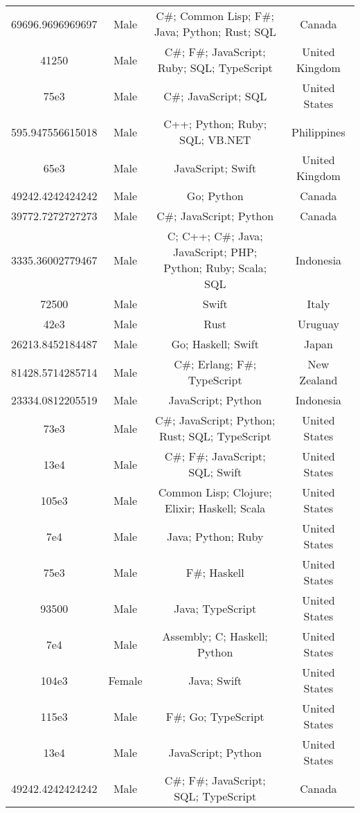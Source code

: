 \begin{center}
\begin{tabular}{ |c|c|c|c| }
69696.9696969697  &  Male  &  C\#; Common Lisp; F\#; Java; Python; Rust; SQL  &  Canada  \\ 
41250  &  Male  &  C\#; F\#; JavaScript; Ruby; SQL; TypeScript  &  United Kingdom  \\ 
75e3  &  Male  &  C\#; JavaScript; SQL  &  United States  \\ 
595.947556615018  &  Male  &  C++; Python; Ruby; SQL; VB.NET  &  Philippines  \\ 
65e3  &  Male  &  JavaScript; Swift  &  United Kingdom  \\ 
49242.4242424242  &  Male  &  Go; Python  &  Canada  \\ 
39772.7272727273  &  Male  &  C\#; JavaScript; Python  &  Canada  \\ 
3335.36002779467  &  Male  &  C; C++; C\#; Java; JavaScript; PHP; Python; Ruby; Scala; SQL  &  Indonesia  \\ 
72500  &  Male  &  Swift  &  Italy  \\ 
42e3  &  Male  &  Rust  &  Uruguay  \\ 
26213.8452184487  &  Male  &  Go; Haskell; Swift  &  Japan  \\ 
81428.5714285714  &  Male  &  C\#; Erlang; F\#; TypeScript  &  New Zealand  \\ 
23334.0812205519  &  Male  &  JavaScript; Python  &  Indonesia  \\ 
73e3  &  Male  &  C\#; JavaScript; Python; Rust; SQL; TypeScript  &  United States  \\ 
13e4  &  Male  &  C\#; F\#; JavaScript; SQL; Swift  &  United States  \\ 
105e3  &  Male  &  Common Lisp; Clojure; Elixir; Haskell; Scala  &  United States  \\ 
7e4  &  Male  &  Java; Python; Ruby  &  United States  \\ 
75e3  &  Male  &  F\#; Haskell  &  United States  \\ 
93500  &  Male  &  Java; TypeScript  &  United States  \\ 
7e4  &  Male  &  Assembly; C; Haskell; Python  &  United States  \\ 
104e3  &  Female  &  Java; Swift  &  United States  \\ 
115e3  &  Male  &  F\#; Go; TypeScript  &  United States  \\ 
13e4  &  Male  &  JavaScript; Python  &  United States  \\ 
49242.4242424242  &  Male  &  C\#; F\#; JavaScript; SQL; TypeScript  &  Canada  \\ 

\end{tabular}
\end{center}
